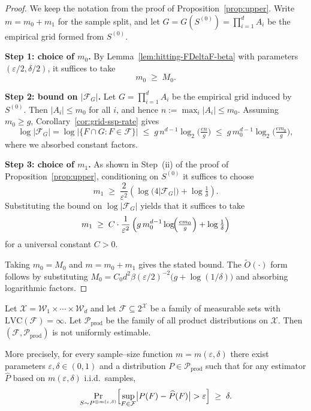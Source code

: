 \documentclass[arxiv]{colt2026}
\newcommand{\X}{\mathcal{X}}
\newcommand{\F}{\mathcal{F}}
\newcommand{\W}{\mathcal{W}}
\newcommand{\Pc}{\mathcal{P}}
\newcommand{\eps}{\varepsilon}
\newcommand{\LVC}{\mathrm{LVC}}
\begin{document}
\begin{proof}
We keep the notation from the proof of Proposition~\ref{prop:upper}.
Write $m=m_0+m_1$ for the sample split, and let
$G=G(S^{(0)})=\prod_{i=1}^d A_i$ be the empirical grid formed from $S^{(0)}$.

\medskip
\noindent\textbf{Step 1: choice of $m_0$.}
By Lemma~\ref{lem:hitting-FDeltaF-beta} with parameters $(\eps/2,\delta/2)$, it
suffices to take
\[
m_0 \;\ge\; M_0.
\]

\medskip
\noindent\textbf{Step 2: bound on $|\F_G|$.}
Let $G=\prod_{i=1}^d A_i$ be the empirical grid induced by $S^{(0)}$.
Then $|A_i|\le m_0$ for all $i$, and hence $n:=\max_i |A_i|\le m_0$.
Assuming $m_0\ge g$, Corollary~\ref{cor:grid-ssp-rate} gives
\[
\log|\F_G|
=
\log\bigl|\{F\cap G:F\in\F\}\bigr|
\;\le\;
g\,n^{d-1}\log_2\!\Big(\tfrac{en}{g}\Big)
\;\le\;
g\,m_0^{d-1}\log_2\!\Big(\tfrac{e m_0}{g}\Big),
\]
where we absorbed constant factors.

\medskip
\noindent\textbf{Step 3: choice of $m_1$.}
As shown in Step~(ii) of the proof of Proposition~\ref{prop:upper}, conditioning
on $S^{(0)}$ it suffices to choose
\[
m_1
\;\ge\;
\frac{2}{\eps^2}
\left(\log\!\bigl(4|\F_G|\bigr)+\log\tfrac{1}{\delta}\right).
\]
Substituting the bound on $\log|\F_G|$ yields that it suffices to take
\[
m_1
\;\ge\;
C\cdot \frac{1}{\eps^2}\left(
g\,m_0^{d-1}\log\!\Bigl(\tfrac{e m_0}{g}\Bigr)
+\log\tfrac{1}{\delta}\right)
\]
for a universal constant $C>0$.

Taking $m_0=M_0$ and $m=m_0+m_1$ gives the stated bound.
The $\tilde O(\cdot)$ form follows by substituting
$M_0=C_0 d^2\beta(\eps/2)^{-2}\bigl(g+\log(1/\delta)\bigr)$ and absorbing logarithmic
factors.
\end{proof}
\begin{proposition}
\label{prop:lower}
Let $\X=\W_1\times\cdots\times\W_d$ and let $\F\subseteq 2^{\X}$ be a family of
measurable sets with $\LVC(\F)=\infty$.
Let $\Pc_{\mathrm{prod}}$ be the family of all product distributions on $\X$.
Then $(\F,\Pc_{\mathrm{prod}})$ is not uniformly estimable.

More precisely, for every sample--size function $m=m(\eps,\delta)$ there exist
parameters $\eps,\delta\in(0,1)$ and a distribution $P\in\Pc_{\mathrm{prod}}$
such that for any estimator $\widehat P$ based on $m(\eps,\delta)$ i.i.d.\ samples,
\[
\Pr_{S\sim P^{\otimes m(\eps,\delta)}}
\Bigl[
\sup_{F\in\F}\bigl|P(F)-\widehat P(F)\bigr|>\eps
\Bigr]
\;\ge\;\delta.
\]
\end{proposition}
\end{document}
